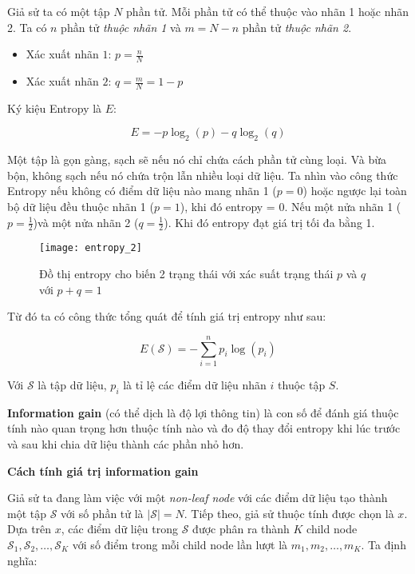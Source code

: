 \documentclass[../main-report.tex]{subfiles}
\begin{document}
Giả sử ta có một tập $N$ phần tử. Mỗi phần tử có thể thuộc vào nhãn 1 hoặc nhãn 2. Ta có $n$ phần tử \emph{thuộc nhãn 1} và $m = N - n$ phần tử \emph{thuộc nhãn 2}. 

\begin{itemize}
\item Xác xuất nhãn $1$: $p = \frac{n}{N}$
\item Xác xuất nhãn $2$: $q = \frac{m}{N} = 1 - p $
\end{itemize}

Ký kiệu Entropy là $E$:

\begin{equation}
E = -p\log _2(p) - q\log _2(q)
\end{equation}

Một tập là gọn gàng, sạch sẽ nếu nó chỉ chứa cách phần tử cùng loại. Và bừa bộn, không sạch nếu nó chứa trộn lẫn nhiều loại dữ liệu. Ta nhìn vào công thức Entropy nếu không có điểm dữ liệu nào mang nhãn 1 ($p = 0$) hoặc ngược lại toàn bộ dữ liệu đều thuộc nhãn 1 ($p = 1$), khi đó entropy = 0. Nếu một nửa nhãn 1 ($p =  \frac{1}{2}$)và một nửa nhãn 2 ($ q = \frac{1}{2}$). Khi đó entropy đạt giá trị tối đa bằng 1.

\begin{figure}[ht!]
\centering\texttt{[image: entropy\_2]}
\caption[Đồ thị entropy cho biến 2 trạng thái]{Đồ thị entropy cho biến 2 trạng thái với xác suất trạng thái $p$ và $q$ với $p + q = 1$}
\label{fig:entropy_2}
\end{figure}

Từ đó ta có công thức tổng quát để tính giá trị entropy như sau:

\begin{equation}
E(\mathcal{S}) = -\sum_{i=1}^n p_i \log(p_i)
\end{equation}

Với $\mathcal{S}$ là tập dữ liệu, $p_i$ là tỉ lệ các điểm dữ liệu nhãn $i$ thuộc tập $S$.

\textbf{Information gain} (có thể dịch là độ lợi thông tin)  là con số để đánh giá thuộc tính nào quan trọng hơn thuộc tính nào và đo độ thay đổi entropy khi lúc trước và sau khi chia dữ liệu thành các phần nhỏ hơn.

\textbf{Cách tính giá trị information gain}

Giả sử ta đang làm việc với một \emph{non-leaf node} với các điểm dữ liệu tạo thành một tập \(\mathcal{S}\) với số phần tử là \(|\mathcal{S}| = N\). Tiếp theo, giả sử thuộc tính được chọn là \(x\). Dựa trên \(x\), các điểm dữ liệu trong \(\mathcal{S}\) được phân ra thành \(K\) child node \(\mathcal{S}_1, \mathcal{S}_2, \dots, \mathcal{S}_K\) với số điểm trong mỗi child node lần lượt là \(m_1, m_2, \dots, m_K\). Ta định nghĩa:
\end{document}

